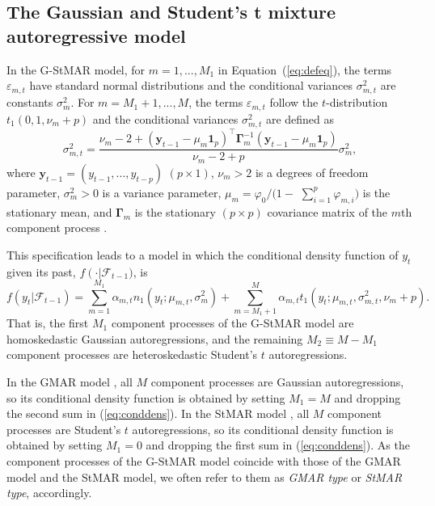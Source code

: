 \documentclass[nojss]{jss} %
\begin{document}
\subsection{The Gaussian and Student's t mixture autoregressive model}\label{sec:gstmar}
In the G-StMAR model, for $m=1,...,M_1$ in Equation~(\ref{eq:defeq}), the terms $\varepsilon_{m,t}$ have standard normal distributions and the conditional variances $\sigma_{m,t}^2$ are constants $\sigma_m^2$. For $m=M_1+1,...,M$, the terms $\varepsilon_{m,t}$ follow the $t$-distribution $t_1(0,1,\nu_m+p)$ and the conditional  variances $\sigma_{m,t}^2$ are defined as
%
\begin{equation}\label{eq:sigmamt}
\sigma_{m,t}^2=\frac{\nu_m-2+(\boldsymbol{y}_{t-1}-\mu_m\mathbf{1}_p)^\top\boldsymbol{\Gamma}_m^{-1}(\boldsymbol{y}_{t-1}-\mu_m\mathbf{1}_p)}{\nu_m-2+p}\sigma_m^2,
\end{equation}
%
where $\boldsymbol{y}_{t-1}=(y_{t-1},...,y_{t-p})$ $(p \times 1)$, $\nu_m>2$ is a degrees of freedom parameter, $\sigma_m^2>0$ is a variance parameter, $\mu_m=\varphi_0/ (1-$ $\sum_{i=1}^p\varphi_{m,i})$ is the stationary mean, and $\boldsymbol{\Gamma}_m$ is the stationary $(p\times p)$ covariance matrix of the $m$th component process \cite[see][Section 2.1]{Virolainen:2020}.

This specification leads to a model in which the conditional density function of $y_t$ given its past, $f\left(\cdot \right | \mathcal{F}_{t-1})$, is
%
\begin{equation}\label{eq:conddens}
f\left(y_t |\mathcal{F}_{t-1}\right)=\sum_{m=1}^{M_1}\alpha_{m,t}n_1(y_t;\mu_{m,t},\sigma_m^2)+\sum_{m=M_1+1}^{M}\alpha_{m,t} t_1\left(y_t;\mu_{m,t},\sigma_{m,t}^2,\nu_m+p\right).
\end{equation}
%
That is, the first $M_1$ component processes of the G-StMAR model are homoskedastic Gaussian autoregressions, and the remaining $M_2\equiv M - M_1$ component processes are heteroskedastic Student's $t$ autoregressions.

In the GMAR model \citep{Kalliovirta+Meitz+Saikkonen:2015}, all $M$ component processes are Gaussian autoregressions, so its conditional density function is obtained by setting $M_1=M$ and dropping the second sum in (\ref{eq:conddens}). In the StMAR model \citep{Meitz+Preve+Saikkonen:2021}, all $M$ component processes are Student's $t$ autoregressions, so its conditional density function is obtained by setting $M_1=0$ and dropping the first sum in (\ref{eq:conddens}). As the component processes of the G-StMAR model coincide with those of the GMAR model and the StMAR model, we often refer to them as \textit{GMAR type} or \textit{StMAR type}, accordingly.
\end{document}
